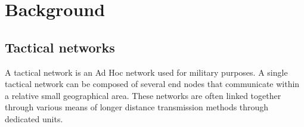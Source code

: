 \chapter{Background}

\section{Tactical networks}
A tactical network is an Ad Hoc network used for military purposes. A single tactical network can be composed of several end nodes that communicate within a relative small geographical area. These networks are often linked together through various means of longer distance transmission methods through dedicated units.

